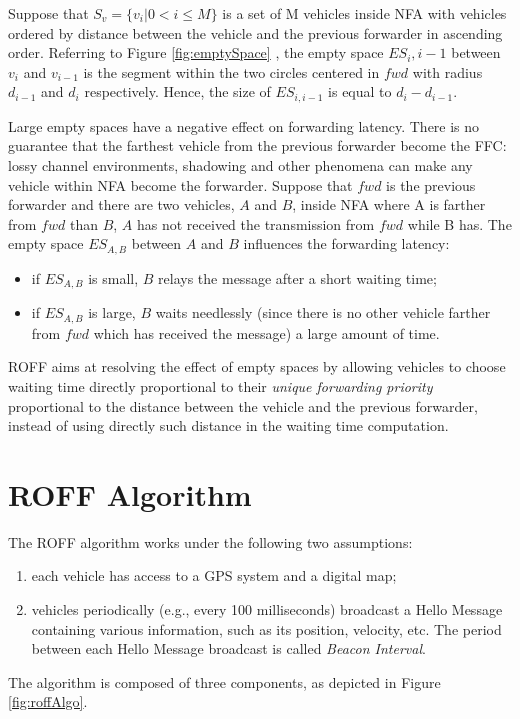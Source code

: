 			Suppose that $S_v = \{v_i | 0 < i \leq M\}$ is a set of M vehicles inside NFA with vehicles ordered by distance between the vehicle and the previous forwarder in ascending order. Referring to Figure \ref{fig:emptySpace} , the empty space $ES_i,i-1$ between $v_i$ and $v_{i-1}$ is the segment within the two circles centered in $fwd$ with radius $d_{i-1}$ and $d_i$ respectively. Hence, the size of $ES_{i,i-1}$ is equal to $d_i - d_{i-1}$.
			
			
			Large empty spaces have a negative effect on forwarding latency. There is no guarantee that the farthest vehicle from the previous forwarder become the FFC: lossy channel environments, shadowing and other phenomena can make any vehicle within NFA become the forwarder. Suppose that $fwd$ is the previous forwarder and there are two vehicles, $A$ and $B$, inside NFA where A is farther from $fwd$ than $B$, $A$ has not received the transmission from $fwd$ while B has. The empty space $ES_{A,B}$ between $A$ and $B$ influences the forwarding latency:
			\begin{itemize}
				\item if  $ES_{A,B}$ is small, $B$ relays the message after a short waiting time;
				\item if $ES_{A,B}$ is large, $B$ waits needlessly (since there is no other vehicle farther from $fwd$ which has received the message) a large amount of time.
			\end{itemize}
			ROFF aims at resolving the effect of empty spaces by allowing vehicles to choose waiting time directly proportional to their \textit{unique forwarding priority} proportional to the distance between the vehicle and the previous forwarder, instead of using directly such distance in the waiting time computation.
		
	\section{ROFF Algorithm}
		The ROFF algorithm works under the following two assumptions:
		\begin{enumerate}
			\item each vehicle has access to a GPS system and a digital map;
			\item vehicles periodically (e.g., every 100 milliseconds) broadcast a Hello Message containing various information, such as its position, velocity, etc. The period between each Hello Message broadcast is called \textit{Beacon Interval}.
		\end{enumerate}
		The algorithm is composed of three components, as depicted in Figure \ref{fig:roffAlgo}.
	
